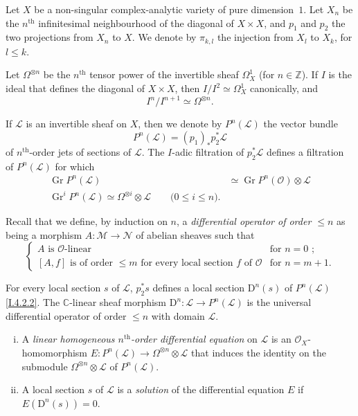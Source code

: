 \documentclass{report}
\theoremstyle{plain}
\theoremstyle{definition}
\newenvironment{definition}[1]
    {\renewcommand\theinnercustomdefinition{#1}\innercustomdefinition}
    {\endinnercustomdefinition}
\newenvironment{env}[1]
    {\renewcommand\theinnercustomenv{#1}\innercustomenv}
    {\endinnercustomenv}
\newcommand{\sh}{\mathscr}
\newcommand{\CC}{\mathbb{C}}
\newcommand{\ZZ}{\mathbb{Z}}
\newcommand{\DD}{\mathrm{D}}
\renewcommand{\leq}{\leqslant}
\DeclareMathOperator{\Gr}{Gr}
\newcommand{\oldpage}[1]{\marginpar{\footnotesize$\Big\vert$ \textit{p.~#1}}}
\begin{document}
\begin{env}{4.2}
\label{I.4.2}
  Let $X$ be a non-singular complex-analytic variety of pure dimension~$1$.
  Let $X_n$ be the $n^\mathrm{th}$ infinitesimal neighbourhood of the diagonal of $X\times X$, and $p_1$ and $p_2$ the two projections from $X_n$ to $X$.
  We denote by $\pi_{k,l}$ the injection from $X_l$ to
\oldpage{24}
  $X_k$, for $l\leq k$.

  Let $\Omega^{\otimes n}$ be the $n^\mathrm{th}$ tensor power of the invertible sheaf $\Omega_X^1$ (for $n\in\ZZ$).
  If $I$ is the ideal that defines the diagonal of $X\times X$, then $I/I^2\simeq\Omega_X^1$ canonically, and
  \[
  \label{I.4.2.1}
    I^n/I^{n+1} \simeq \Omega^{\otimes n}.
  \tag{4.2.1}
  \]

  If $\sh{L}$ is an invertible sheaf on $X$, then we denote by $P^n(\sh{L})$ the vector bundle
  \[
  \label{I.4.2.2}
    P^n(\sh{L}) = (p_1)_*p_2^*\sh{L}
  \tag{4.2.2}
  \]
  of $n^\mathrm{th}$-order jets of sections of $\sh{L}$.
  The $I$-adic filtration of $p_2^*\sh{L}$ defines a filtration of $P^n(\sh{L})$ for which
  \[
  \label{I.4.2.3}
    \begin{aligned}
      \Gr P^n(\sh{L}) &\simeq \Gr P^n(\sh{O})\otimes\sh{L}
    \\\Gr^i P^n(\sh{L}) \simeq \Omega^{\otimes i}\otimes\sh{L} \qquad\mbox{($0\leq i\leq n$).}
    \end{aligned}
  \tag{4.2.3}
  \]

  Recall that we define, by induction on $n$, a \emph{differential operator of order $\leq n$} as being a morphism $A\colon\sh{M}\to\sh{N}$ of abelian sheaves such that
  \[
    \begin{cases}
      \mbox{$A$ is $\sh{O}$-linear} & \mbox{for $n=0$ ;}
    \\\mbox{$[A,f]$ is of order $\leq m$ for every local section $f$ of $\sh{O}$} & \mbox{for $n=m+1$.}
    \end{cases}
  \]

  For every local section $s$ of $\sh{L}$, $p_2^*s$ defines a local section $\DD^n(s)$ of $P^n(\sh{L})$ \cref{I.4.2.2}.
  The $\CC$-linear sheaf morphism $\DD^n\colon\sh{L}\to P^n(\sh{L})$ is the universal differential operator of order $\leq n$ with domain $\sh{L}$.
\end{env}

\begin{definition}{4.3}
\label{I.4.3}
  \begin{enumerate}[(i)]
    \item A \emph{linear homogeneous $n^\mathrm{th}$-order differential equation} on $\sh{L}$ is an $\sh{O}_X$-homomorphism $E\colon P^n(\sh{L})\to\Omega^{\otimes n}\otimes\sh{L}$ that induces the identity on the submodule $\Omega^{\otimes n}\otimes\sh{L}$ of $P^n(\sh{L})$.
    \item A local section $s$ of $\sh{L}$ is a \emph{solution} of the differential equation $E$ if $E(\DD^n(s))=0$.
  \end{enumerate}
\end{definition}
\end{document}
